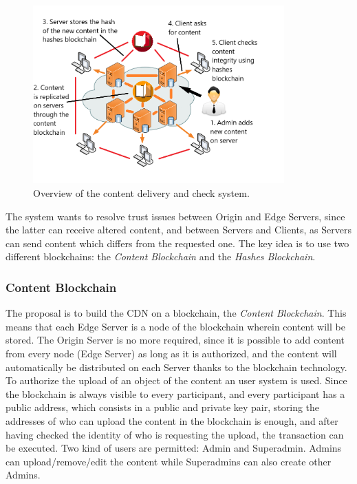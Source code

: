 \documentclass[conference,compsoc]{IEEEtran}
\begin{document}
\begin{figure}[!h]
	\centering
	\includegraphics[width=3.8in]{images/SystemOverview.png}
	
	\caption{Overview of the content delivery and check system.}
	\label{fig:SystemOverview}
\end{figure} 

The system wants to resolve trust issues between Origin and Edge Servers, since the latter can receive altered content, and between Servers and Clients, as Servers can send content which differs from the requested one. The key idea is to use two different blockchains: the \textit{Content Blockchain} and the \textit{Hashes Blockchain}.
\subsubsection{Content Blockchain}
The proposal is to build the CDN on a blockchain, the \textit{Content Blockchain}. This means that each Edge Server is a node of the blockchain wherein content will be stored. The Origin Server is no more required, since it is possible to add content from every node (Edge Server) as long as it is authorized, and the content will automatically be distributed on each Server thanks to the blockchain technology. To authorize the upload of an object of the content an user system is used. Since the blockchain is always visible to every participant, and every participant has a public address, which consists in a public and private key pair, storing the addresses of who can upload the content in the blockchain is enough, and after having checked the identity of who is requesting the upload, the transaction can be executed. Two kind of users are permitted: Admin and Superadmin. Admins can upload/remove/edit the content while Superadmins can also create other Admins. 
\end{document}
